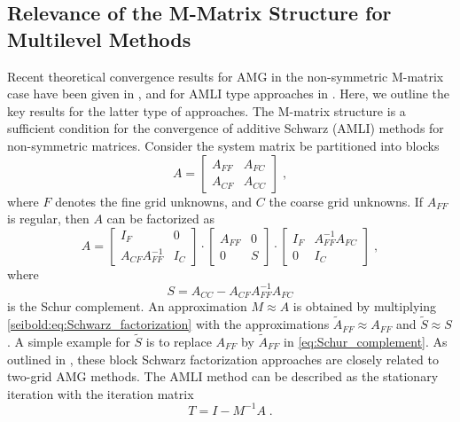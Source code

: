 \documentclass[reqno]{amsart}
\theoremstyle{plain}
\theoremstyle{definition}
\theoremstyle{remark}
\begin{document}
\subsection{Relevance of the M-Matrix Structure for Multilevel Methods}
\label{seibold:subsec:mmatrix_multilevel}
Recent theoretical convergence results for AMG in the non-symmetric M-matrix case have
been given in \cite{Notay2000,Notay2009}, and for AMLI type approaches in
\cite{MenseNabben2008_1,MenseNabben2008_2}. Here, we outline the key results for the
latter type of approaches. The M-matrix structure is a sufficient condition for the
convergence of additive Schwarz (AMLI) methods for non-symmetric matrices.
Consider the system matrix be partitioned into blocks
\begin{equation*}
A = \begin{bmatrix} A_{FF} & A_{FC} \\ A_{CF} & A_{CC} \end{bmatrix}\;,
\end{equation*}
where $F$ denotes the fine grid unknowns, and $C$ the coarse grid unknowns.
If $A_{FF}$ is regular, then $A$ can be factorized as
\begin{equation}
A = \begin{bmatrix} I_F & 0 \\ A_{CF}A_{FF}^{-1} & I_C \end{bmatrix}\cdot
\begin{bmatrix} A_{FF} & 0 \\ 0 & S \end{bmatrix}\cdot
\begin{bmatrix} I_F & A_{FF}^{-1}A_{FC} \\ 0 & I_C \end{bmatrix}\;,
\label{seibold:eq:Schwarz_factorization}
\end{equation}
where
\begin{equation}
S = A_{CC}-A_{CF}A_{FF}^{-1}A_{FC}
\label{eq:Schur_complement}
\end{equation}
is the Schur complement.
An approximation $M\approx A$ is obtained by multiplying \eqref{seibold:eq:Schwarz_factorization}
with the approximations $\tilde{A}_{FF}\approx A_{FF}$ and $\tilde{S}\approx S$.
A simple example for $\tilde{S}$ is to replace $A_{FF}$ by $\tilde{A}_{FF}$
in \eqref{eq:Schur_complement}.
As outlined in \cite{MenseNabben2008_2}, these block Schwarz factorization
approaches are closely related to two-grid AMG methods.
The AMLI method can be described as the stationary iteration with the iteration
matrix
\begin{equation*}
T = I-M^{-1}A\;.
\end{equation*}
\end{document}
